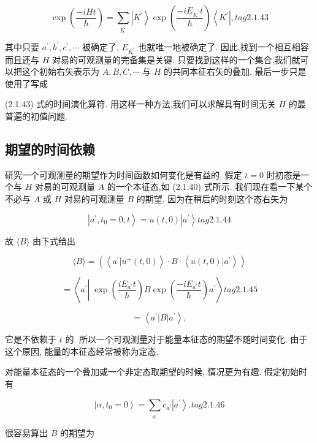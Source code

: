 \documentclass[lang=cn,newtx,10pt,scheme=chinese,thmcnt=section]{elegantbook}
\begin{document}
$$
\exp \left( \frac{-{iHt}}{\hbar }\right) = \mathop{\sum }\limits_{{K}^{\prime }}\left| {K}^{\prime }\right\rangle \exp \left( \frac{-i{E}_{{K}^{\prime }}t}{\hbar }\right) \left\langle {K}^{\prime }\right| , tag{2.1.43}
$$

其中只要 ${a}^{\prime },{b}^{\prime },{c}^{\prime },\cdots$ 被确定了, ${E}_{{K}^{\prime }}$ 也就唯一地被确定了. 因此,找到一个相互相容而且还与 $H$ 对易的可观测量的完备集是关键. 只要找到这样的一个集合,我们就可以把这个初始右矢表示为 $A, B, C,\cdots$ 与 $H$ 的共同本征右矢的叠加. 最后一步只是使用了写成

(2.1.43) 式的时间演化算符. 用这样一种方法,我们可以求解具有时间无关 $H$ 的最普遍的初值问题.

\subsection*{期望的时间依赖}

研究一个可观测量的期望作为时间函数如何变化是有益的. 假定 $t = 0$ 时初态是一个与 $H$ 对易的可观测量 $A$ 的一个本征态,如 (2.1.40) 式所示. 我们现在看一下某个不必与 $A$ 或 $H$ 对易的可观测量 $B$ 的期望. 因为在稍后的时刻这个态右矢为

$$
\left| {{a}^{\prime },{t}_{0} = 0;t}\right\rangle = u\left( {t,0}\right) \left| {a}^{\prime }\right\rangle tag{2.1.44}
$$

故 $\langle B\rangle$ 由下式给出

$$
\langle B\rangle = \left( {\left\langle {{a}^{\prime } | {u}^{ + }\left( {t,0}\right) }\right\rangle \cdot B \cdot \left\langle {u\left( {t,0}\right) | {a}^{\prime }}\right\rangle }\right)
$$

$$
= \left\langle {{a}^{\prime }\left| {\;\exp \left( \frac{i{E}_{{a}^{\prime }}t}{\hbar }\right) B\exp \left( \frac{-i{E}_{{a}^{\prime }}t}{\hbar }\right) }\right. {a}^{\prime }}\right\rangle tag{2.1.45}
$$

$$
= \left\langle {{a}^{\prime }\left| B\right| {a}^{\prime }}\right\rangle ,
$$

它是不依赖于 $t$ 的. 所以一个可观测量对于能量本征态的期望不随时间变化. 由于这个原因, 能量的本征态经常被称为定态.

对能量本征态的一个叠加或一个非定态取期望的时候, 情况更为有趣. 假定初始时有

$$
\left| {\alpha ,{t}_{0} = 0}\right\rangle = \mathop{\sum }\limits_{{a}^{\prime }}{c}_{{a}^{\prime }}\left| {a}^{\prime }\right\rangle . tag{2.1.46}
$$

很容易算出 $B$ 的期望为
\end{document}
